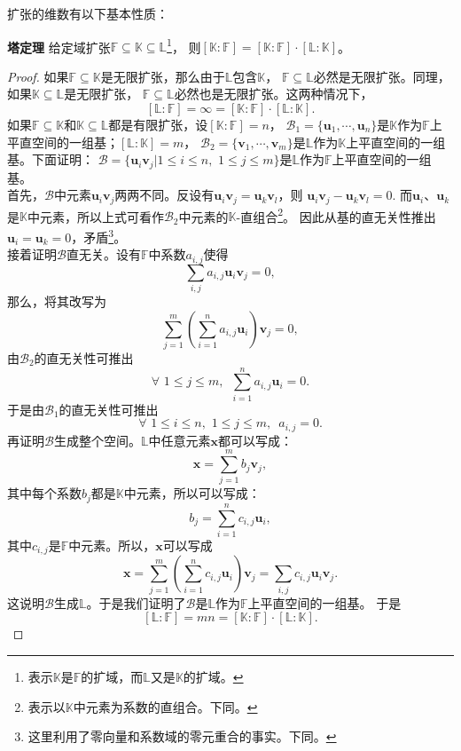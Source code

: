 \documentclass[12pt,UTF8,fontset=none]{ctexbook}
\begin{document}
\begin{appendix}
扩张的维数有以下基本性质：
\begin{pp}\textbf{塔定理 }\label{pp:9_0}
    给定域扩张$\mathbb{F} \subseteq \mathbb{K} \subseteq \mathbb{L}$\footnote{表示$\mathbb{K}$是$\mathbb{F}$的扩域，而$\mathbb{L}$又是$\mathbb{K}$的扩域。}，
    则$[\mathbb{K} : \mathbb{F}] = [\mathbb{K} : \mathbb{F}]\cdot [\mathbb{L} : \mathbb{K}]$。
\end{pp}
\begin{proof} %
    如果$\mathbb{F} \subseteq \mathbb{K}$是无限扩张，那么由于$\mathbb{L}$包含$\mathbb{K}$，
    $\mathbb{F} \subseteq \mathbb{L}$必然是无限扩张。同理，如果$\mathbb{K} \subseteq \mathbb{L}$是无限扩张，
    $\mathbb{F} \subseteq \mathbb{L}$必然也是无限扩张。这两种情况下，
    $$[\mathbb{L} : \mathbb{F}] = \infty = [\mathbb{K} : \mathbb{F}]\cdot [\mathbb{L} : \mathbb{K}].$$
    如果$\mathbb{F} \subseteq \mathbb{K}$和$\mathbb{K} \subseteq \mathbb{L}$都是有限扩张，设$[\mathbb{K} : \mathbb{F}] = n$，
    $\mathcal{B}_1 = \{\mathbf{u}_1, \cdots, \mathbf{u}_n\}$是$\mathbb{K}$作为$\mathbb{F}$上平直空间的一组基；$[\mathbb{L} : \mathbb{K}] = m$，
    $\mathcal{B}_2 = \{\mathbf{v}_1, \cdots, \mathbf{v}_m\}$是$\mathbb{L}$作为$\mathbb{K}$上平直空间的一组基。下面证明：
    $\mathcal{B} = \{\mathbf{u}_i\mathbf{v}_j | 1 \leqslant i \leqslant n, \,\, 1 \leqslant j \leqslant m \}$是$\mathbb{L}$作为$\mathbb{F}$上平直空间的一组基。\\
    首先，$\mathcal{B}$中元素$\mathbf{u}_i\mathbf{v}_j$两两不同。反设有$\mathbf{u}_i\mathbf{v}_j = \mathbf{u}_k\mathbf{v}_l$，则
    $ \mathbf{u}_i\mathbf{v}_j - \mathbf{u}_k\mathbf{v}_l = 0.$ 
    而$\mathbf{u}_i$、$\mathbf{u}_k$是$\mathbb{K}$中元素，所以上式可看作$\mathcal{B}_2$中元素的$\mathbb{K}$-直组合\footnote{表示以$\mathbb{K}$中元素为系数的直组合。下同。}。
    因此从基的直无关性推出$\mathbf{u}_i = \mathbf{u}_k = 0$，矛盾\footnote{这里利用了零向量和系数域的零元重合的事实。下同。}。\\
    接着证明$\mathcal{B}$直无关。设有$\mathbb{F}$中系数$a_{i,j}$使得
    $$ \sum_{i,j} a_{i,j}\mathbf{u}_i\mathbf{v}_j = 0,$$
    那么，将其改写为
    $$ \sum_{j=1}^m \left(\sum_{i=1}^n a_{i,j}\mathbf{u}_i \right) \mathbf{v}_j = 0,$$
    由$\mathcal{B}_2$的直无关性可推出
    $$ \forall \,\, 1 \leqslant j \leqslant m , \,\,\, \sum_{i=1}^n a_{i,j}\mathbf{u}_i = 0.$$
    于是由$\mathcal{B}_1$的直无关性可推出
    $$ \forall \,\, 1 \leqslant i \leqslant n, \,\,1 \leqslant j \leqslant m , \,\,\,a_{i,j} = 0.$$
    再证明$\mathcal{B}$生成整个空间。$\mathbb{L}$中任意元素$\mathbf{x}$都可以写成：
    $$\mathbf{x} = \sum_{j=1}^m b_j \mathbf{v}_j,$$ 
    其中每个系数$b_j$都是$\mathbb{K}$中元素，所以可以写成：
    $$ b_j = \sum_{i=1}^n c_{i,j}\mathbf{u}_i , $$
    其中$c_{i,j}$是$\mathbb{F}$中元素。所以，$\mathbf{x}$可以写成
    $$ \mathbf{x} = \sum_{j=1}^m \left(\sum_{i=1}^n c_{i,j}\mathbf{u}_i \right) \mathbf{v}_j = \sum_{i,j} c_{i,j}\mathbf{u}_i\mathbf{v}_j.$$
    这说明$\mathcal{B}$生成$\mathbb{L}$。于是我们证明了$\mathcal{B}$是$\mathbb{L}$作为$\mathbb{F}$上平直空间的一组基。
    于是
    $$[\mathbb{L} : \mathbb{F}] = mn = [\mathbb{K} : \mathbb{F}]\cdot [\mathbb{L} : \mathbb{K}].$$
\end{proof}
 

\end{appendix}
\end{document}
